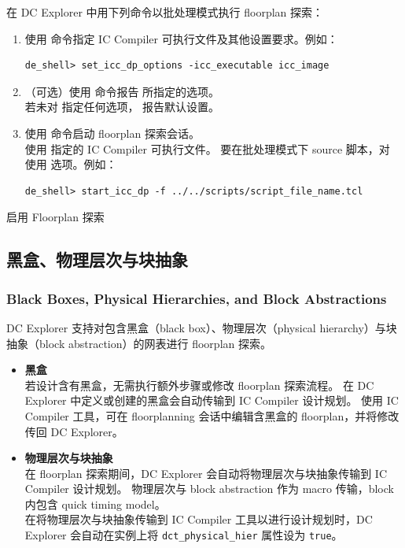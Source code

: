 在 DC Explorer 中用下列命令以批处理模式执行 floorplan 探索：
\begin{enumerate}
  \item 使用  命令指定 IC Compiler 可执行文件及其他设置要求。例如：
\begin{lstlisting}
de_shell> set_icc_dp_options -icc_executable icc_image
\end{lstlisting}
  \item （可选）使用  命令报告  所指定的选项。\\
        若未对  指定任何选项， 报告默认设置。
  \item 使用  命令启动 floorplan 探索会话。\\
         使用  指定的 IC Compiler 可执行文件。
        要在批处理模式下 source 脚本，对  使用  选项。例如：
\begin{lstlisting}
de_shell> start_icc_dp -f ../../scripts/script_file_name.tcl
\end{lstlisting}
\end{enumerate}

\begin{seeAlsoBox}
启用 Floorplan 探索
\end{seeAlsoBox}

\subsection{黑盒、物理层次与块抽象}
\subsubsection*{Black Boxes, Physical Hierarchies, and Block Abstractions}

DC Explorer 支持对包含黑盒（black box）、物理层次（physical hierarchy）与块抽象（block abstraction）的网表进行 floorplan 探索。
\begin{itemize}
  \item \textbf{黑盒}\\
        若设计含有黑盒，无需执行额外步骤或修改 floorplan 探索流程。
        在 DC Explorer 中定义或创建的黑盒会自动传输到 IC Compiler 设计规划。
        使用 IC Compiler 工具，可在 floorplanning 会话中编辑含黑盒的 floorplan，并将修改传回 DC Explorer。
  \item \textbf{物理层次与块抽象}\\
        在 floorplan 探索期间，DC Explorer 会自动将物理层次与块抽象传输到 IC Compiler 设计规划。
        物理层次与 block abstraction 作为 macro 传输，block 内包含 quick timing model。\\
        在将物理层次与块抽象传输到 IC Compiler 工具以进行设计规划时，DC Explorer 会自动在实例上将 \texttt{dct\_physical\_hier} 属性设为 \texttt{true}。
\end{itemize}

